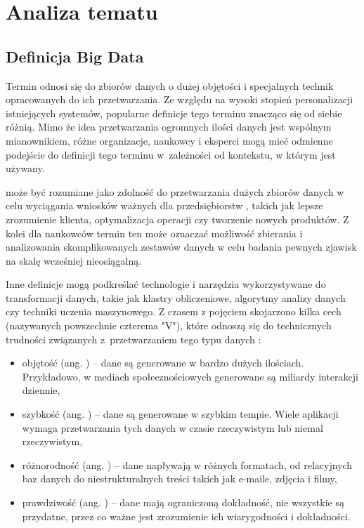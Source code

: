 \chapter{Analiza tematu} \label{ch:analiza-tematu}

\section{Definicja Big Data}

Termin  odnosi się do zbiorów danych o dużej objętości i specjalnych technik
opracowanych do ich przetwarzania. Ze względu na wysoki stopień personalizacji istniejących
systemów, popularne definicje tego terminu znacząco się od siebie różnią. Mimo że idea przetwarzania
ogromnych ilości danych jest wspólnym mianownikiem, różne organizacje, naukowcy i eksperci mogą
mieć odmienne podejście do definicji tego terminu w~zależności od kontekstu, w którym jest używany.

 może być rozumiane jako zdolność do przetwarzania dużych zbiorów danych
w celu wyciągania wniosków ważnych dla przedsiębiorstw \cite{big-data-2}, takich jak lepsze
zrozumienie klienta, optymalizacja operacji czy tworzenie nowych produktów. Z kolei dla
naukowców termin ten może oznaczać możliwość zbierania i analizowania skomplikowanych
zestawów danych w celu badania pewnych zjawisk na skalę wcześniej nieosiągalną.

Inne definicje mogą podkreślać technologie i narzędzia wykorzystywane do transformacji danych,
takie jak klastry obliczeniowe, algorytmy analizy danych czy techniki uczenia maszynowego.
Z czasem z pojęciem  skojarzono kilka cech (nazywanych powszechnie czterema "V"),
które odnoszą się do technicznych trudności związanych z~przetwarzaniem tego typu danych \cite{big-data-1}:
\begin{itemize}
      \item objętość (ang. ) -- dane są generowane w bardzo dużych ilościach.
            Przykładowo, w mediach społecznościowych generowane są miliardy interakcji dziennie,
      \item szybkość (ang. ) -- dane są generowane w szybkim tempie.
            Wiele aplikacji wymaga przetwarzania tych danych w czasie rzeczywistym lub niemal rzeczywistym,
      \item różnorodność (ang. ) -- dane napływają w różnych formatach, od
            relacyjnych baz danych do niestrukturalnych treści takich jak e-maile, zdjęcia i filmy,
      \item prawdziwość (ang. ) -- dane mają ograniczoną dokładność, nie wszystkie
            są przydatne, przez co ważne jest zrozumienie ich wiarygodności i dokładności.
\end{itemize}

